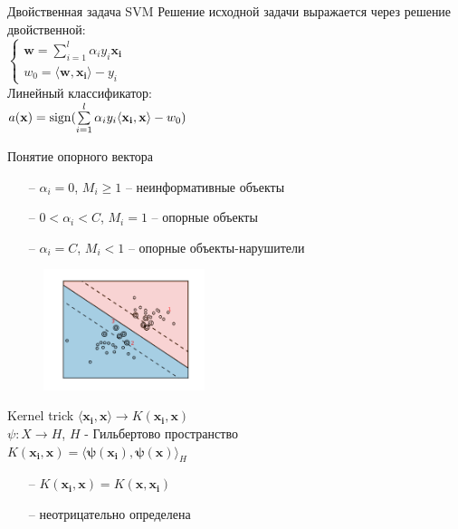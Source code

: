 \documentclass[12pt]{beamer}
\begin{document}
\begin{frame}{Двойственная задача SVM}
	Решение исходной задачи выражается через решение двойственной:\\
	$\begin{cases}
	\mathbf{w} = \sum\limits_{i = 1}^l \alpha_iy_i\mathbf{x_i}\\
	w_0 = \langle \mathbf{w}, \mathbf{x_i} \rangle - y_i
	\end{cases}$\\
	\bigbreak
	\pause
	Линейный классификатор:\\
	$a(\mathbf{x}) = \operatorname{sign}(\sum\limits_{i=1}^l \alpha_iy_i \langle \mathbf{x_i}, \mathbf{x} \rangle - w_0)$
\end{frame}

\begin{frame}{Понятие опорного вектора}
	\begin{itemize}
		\item[--] $\alpha_i = 0$, $M_i \geq 1$ -- неинформативные объекты
		\item[--] $0 < \alpha_i < C$, $M_i = 1$ -- опорные объекты
		\item[--] $\alpha_i = C$, $M_i < 1$ -- опорные объекты-нарушители
	\end{itemize}
	
	\begin{figure}[htbp]
	  \includegraphics[height=100pt, keepaspectratio = true]{images/classification}   
	\end{figure}

\end{frame}

\begin{frame}{Kernel trick}
	$\langle \mathbf{x_i}, \mathbf{x} \rangle \rightarrow K(\mathbf{x_i}, \mathbf{x})$\\
	\bigbreak
	$\psi: X \rightarrow H$, $H$ - Гильбертово пространство\\
	$K(\mathbf{x_i}, \mathbf{x}) = \langle \mathbf{\psi(x_i)}, \mathbf{\psi(x)} \rangle_H$
	\begin{itemize}
		\item[--] $K(\mathbf{x_i}, \mathbf{x}) = K(\mathbf{x}, \mathbf{x_i})$
		\item[--] неотрицательно определена
	\end{itemize}
\end{frame}
\end{document}
